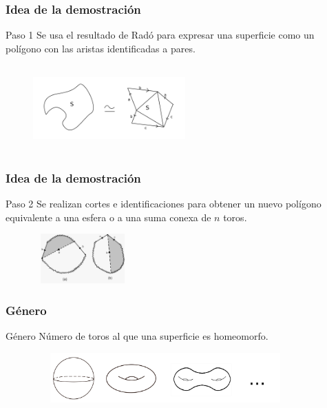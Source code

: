 \documentclass{beamer}
\begin{document}

\begin{frame}
\frametitle{Idea de la demostración}

\begin{block}{Paso 1}
Se usa el resultado de Radó para expresar una superficie como un polígono con las aristas identificadas a pares.
\begin{figure}[htb]
\begin{center}
\includegraphics[width=2.3in,height=1.3in]{imagenes/paso1.png} 
\end{center}
\end{figure}
\end{block}

 
\end{frame}



\begin{frame}
\frametitle{Idea de la demostración}
\begin{block}{Paso 2}
Se realizan cortes e identificaciones para obtener un nuevo polígono equivalente a una esfera o a una suma conexa de $n$ toros.


\begin{figure}[htb]
\begin{center}
\includegraphics[width=1.5in,height=0.75in]{imagenes/paso4.jpeg} 
\end{center}
\end{figure}

\end{block}
 
\end{frame}


\begin{frame}
\frametitle{Género}
\begin{block}{Género}
Número de toros al que una superficie es homeomorfo.
\end{block}
\begin{figure}[htb]
\begin{center}
\includegraphics[width=4in,height=0.75in]{imagenes/diapo4.png} 
\end{center}
\end{figure}

\end{frame}
\end{document}
